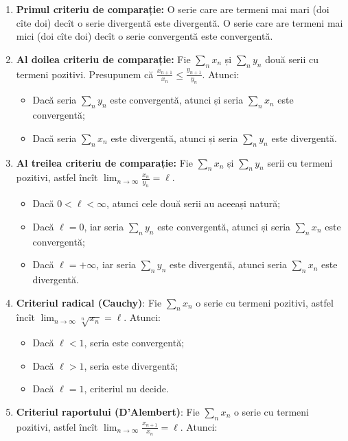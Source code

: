 \documentclass[11pt,a4paper]{article}
\newcommand\ds{\displaystyle}
\theoremstyle{dotless}
\theoremstyle{dotlessdr}
\begin{document}
\begin{enumerate}[(1)]
  \item \textbf{Primul criteriu de comparație:} O serie care are termeni mai mari
    (doi cîte doi) decît o serie divergentă este divergentă. O serie care are termeni
    mai mici (doi cîte doi) decît o serie convergentă este convergentă.
  \item \textbf{Al doilea criteriu de comparație:} Fie $\sum_n x_n$ și $\sum_n y_n$
    două serii cu termeni pozitivi. Presupunem că $\frac{x_{n+1}}{x_n} \leq \frac{y_{n+1}}{y_n}$.
    Atunci:
    \begin{itemize}
      \item Dacă seria $\sum_n y_n$ este convergentă, atunci și seria $\sum_n x_n$ este
        convergentă;
      \item Dacă seria $\sum_n x_n$ este divergentă, atunci și seria $\sum_n y_n$ este
        divergentă.
    \end{itemize}
  \item \textbf{Al treilea criteriu de comparație:} Fie $\sum_n x_n$ și $\sum_n y_n$ serii
    cu termeni pozitivi, astfel încît $\ds\lim_{n \to \infty} \frac{x_n}{y_n} = \ell$.
    \begin{itemize}
      \item Dacă $0 < \ell < \infty$, atunci cele două serii au aceeași natură;
      \item Dacă $\ell = 0$, iar seria $\sum_n y_n$ este convergentă, atunci și seria
        $\sum_n x_n$ este convergentă;
      \item Dacă $\ell = +\infty$, iar seria $\sum_n y_n$ este divergentă, atunci seria
        $\sum_n x_n$ este divergentă.
    \end{itemize}
  \item \textbf{Criteriul radical (Cauchy)}: Fie $\sum_n x_n$ o serie cu termeni pozitivi,
    astfel încît $\ds\lim_{n \to \infty} \sqrt[n]{x_n} = \ell$. Atunci:
    \begin{itemize}
      \item Dacă $\ell < 1$, seria este convergentă;
      \item Dacă $\ell > 1$, seria este divergentă;
      \item Dacă $\ell = 1$, criteriul nu decide.
    \end{itemize}
  \item \textbf{Criteriul raportului (D'Alembert)}: Fie $\sum_n x_n$ o serie cu termeni
    pozitivi, astfel încît $\ds\lim_{n \to \infty} \frac{x_{n+1}}{x_n} = \ell$. Atunci:
    \begin{itemize}

\end{itemize}
\end{enumerate}
\end{document}
